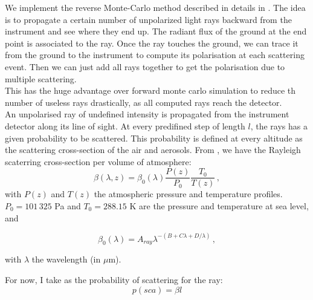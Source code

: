 \documentclass{article}
\begin{document}
We implement the reverse Monte-Carlo method described in details in \citep{yong2016}.
The idea is to propagate a certain number of unpolarized light rays backward from the instrument and see where they end up.
The radiant flux of the ground at the end point is associated to the ray.
Once the ray touches the ground, we can trace it from the ground to the instrument to compute its polarisation at each scattering event.
Then we can just add all rays together to get the polarisation due to multiple scattering.\\

This has the huge advantage over forward monte carlo simulation to reduce th number of useless rays drastically, as all computed rays reach the detector.\\

An unpolarised ray of undefined intensity is propagated from the instrument detector along its line of sight.
At every predifined step of length $l$, the rays has a given probability to be scattered.
This probability is defined at every altitude as the scattering cross-section of the air and aerosols.
From \cite{bucholtz1995}, we have the Rayleigh scaterring cross-section per volume of atmosphere:
\begin{equation}
\beta(\lambda, z) = \beta_0(\lambda) \frac{P(z)}{P_0} \frac{T_0}{T(z)}\,,
  \label{eq:beta_z}
\end{equation}
with $P(z)$ and $T(z)$ the atmospheric pressure and temperature profiles.
$P_0 = 101\,325$ Pa and $T_0 = 288.15$ K are the pressure and temperature at sea level, and
\begin{linenomath*}\begin{equation}
    \beta_0(\lambda) = A_{ray}\lambda^{-(B+C\lambda + D/\lambda)}\,,
    \label{eqn:sqlaw}
\end{equation}\end{linenomath*}
with $\lambda$ the wavelength (in $\mu$m).

For now, I take as the probability of scattering for the ray:
\begin{equation}
  p(sca) = \beta l
\end{equation}
\end{document}
